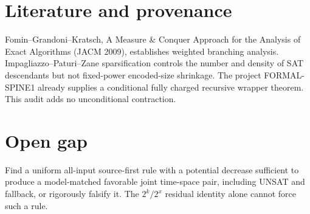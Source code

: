 \documentclass{article}
\begin{document}
\section*{Literature and provenance}
Fomin--Grandoni--Kratsch, A Measure \& Conquer Approach for the Analysis of Exact Algorithms (JACM 2009), establishes weighted branching analysis. Impagliazzo--Paturi--Zane sparsification controls the number and density of SAT descendants but not fixed-power encoded-size shrinkage. The project FORMAL-SPINE1 already supplies a conditional fully charged recursive wrapper theorem. This audit adds no unconditional contraction.
\section*{Open gap}
Find a uniform all-input source-first rule with a potential decrease sufficient to produce a model-matched favorable joint time-space pair, including UNSAT and fallback, or rigorously falsify it. The $2^k/2^x$ residual identity alone cannot force such a rule.
\end{document}
